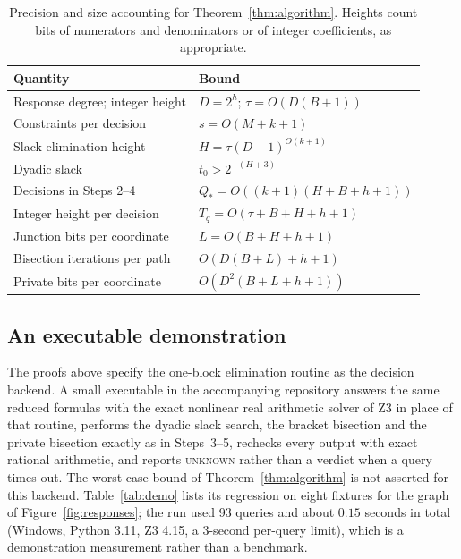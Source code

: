 \documentclass[11pt,a4paper]{article}
\theoremstyle{plain}
\theoremstyle{definition}
\theoremstyle{remark}
\begin{document}
\begin{table}[t]
\centering\small
\begin{tabular}{@{}ll@{}}\toprule
Quantity & Bound \\\midrule
Response degree; integer height & $D=2^h$; $\tau=O(D(B+1))$ \\
Constraints per decision & $s=O(M+k+1)$ \\
Slack-elimination height & $H=\tau(D+1)^{O(k+1)}$ \\
Dyadic slack & $t_0>2^{-(H+3)}$ \\
Decisions in Steps 2--4 & $Q_*=O((k+1)(H+B+h+1))$ \\
Integer height per decision & $T_q=O(\tau+B+H+h+1)$ \\
Junction bits per coordinate & $L=O(B+H+h+1)$ \\
Bisection iterations per path & $O(D(B+L)+h+1)$ \\
Private bits per coordinate & $O(D^2(B+L+h+1))$ \\\bottomrule
\end{tabular}
\caption{Precision and size accounting for Theorem~\ref{thm:algorithm}. Heights count bits of numerators and denominators or of integer coefficients, as appropriate.}
\label{tab:precision}
\end{table}

\subsection{An executable demonstration}\label{sec:demo}

The proofs above specify the one-block elimination routine as the decision backend. A small executable in the accompanying repository answers the same reduced formulas with the exact nonlinear real arithmetic solver of Z3 \citep{demoura2008,jovanovic2012} in place of that routine, performs the dyadic slack search, the bracket bisection and the private bisection exactly as in Steps~3--5, rechecks every output with exact rational arithmetic, and reports \textsc{unknown} rather than a verdict when a query times out. The worst-case bound of Theorem~\ref{thm:algorithm} is not asserted for this backend. Table~\ref{tab:demo} lists its regression on eight fixtures for the graph of Figure~\ref{fig:responses}; the run used 93 queries and about $0.15$ seconds in total (Windows, Python 3.11, Z3 4.15, a 3-second per-query limit), which is a demonstration measurement rather than a benchmark.
\end{document}
